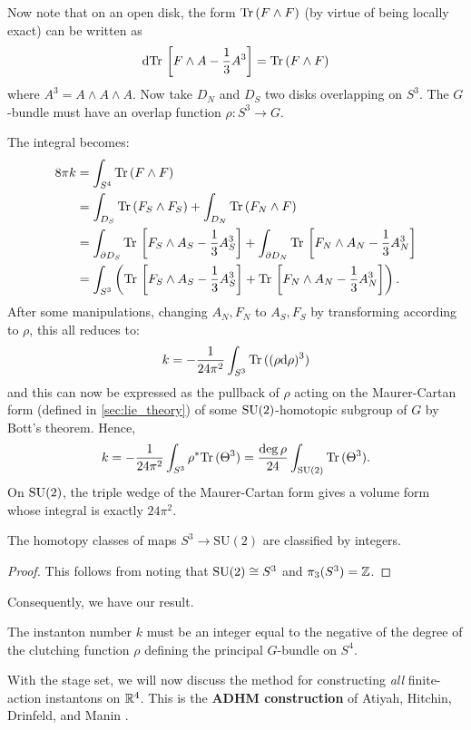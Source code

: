 		Now note that on an open disk, the form $\mathrm{Tr}\, (F \wedge F)$ (by virtue of being locally exact) can be written as 
		\[
			\mathrm{d} \mathrm{Tr}\, \left[F \wedge A - \frac13 A^3 \right] = \mathrm{Tr}\,( F \wedge F)
		\]
		where $A^3 = A \wedge A \wedge A$.
		Now take $D_N$ and $D_S$ two disks overlapping on $S^3$. The $G$-bundle must have an overlap function $\rho: S^3 \to G$.
	
		The integral becomes:
		\[
		\begin{aligned}
			8\pi k &= \int_{S^4} \mathrm{Tr}\, (F \wedge F)\\
				   &= \int_{D_S} \mathrm{Tr}\, (F_S \wedge F_S) + \int_{D_N} \mathrm{Tr}\, (F_N \wedge F)\\
				   &= \int_{\partial D_S} \mathrm{Tr}\, \left[F_S \wedge A_S - \frac13 A_S^3 \right] 
				   + \int_{\partial D_N} \mathrm{Tr}\, \left[F_N \wedge A_N - \frac13 A_N^3 \right]\\
				   &= \int_{S^3} \left( \mathrm{Tr}\, \left[F_S \wedge A_S - \frac13 A_S^3 \right] + \mathrm{Tr}\, \left[F_N \wedge A_N - \frac13 A_N^3 \right] \right).
		\end{aligned}
		\]
		After some manipulations, changing $A_N, F_N$ to $A_S, F_S$ by transforming according to $\rho$, this all reduces to:
		\[
			k = - \frac{1}{24\pi^2} \int_{S^3} \mathrm{Tr}\,((\rho \mathrm{d} \rho)^3)
		\]
		and this can now be expressed as the pullback of $\rho$ acting on the Maurer-Cartan form (defined in \ref{sec:lie_theory}) of some $\mathrm{SU}(2)$-homotopic subgroup of $G$ by Bott's theorem. Hence,
		\[
			k = - \frac{1}{24\pi^2} \int_{S^3} \rho^* \mathrm{Tr}\,(\Theta^3) = \frac{\deg \rho}{24} \int_{\mathrm{SU}(2)} \mathrm{Tr}\,(\Theta^3).
		\]
		On $\mathrm{SU}(2)$, the triple wedge of the Maurer-Cartan form gives a volume form whose integral is exactly $24\pi^2$.

		\begin{prop}
			The homotopy classes of maps $S^3 \to \mathrm{SU}(2)$ are classified by integers.
		\end{prop}
		\begin{proof}
			This follows from noting that $\mathrm{SU}(2) \cong S^3$ and $\pi_3(S^3) = \mathbb{Z}$.
		\end{proof}
		\noindent Consequently, we have our result.
		\begin{prop}
			 The instanton number $k$ must be an integer equal to the negative of the degree of the clutching function $\rho$ defining the principal $G$-bundle on $S^4$.
		\end{prop}
		
		\noindent With the stage set, we will now discuss the method for constructing \emph{all} finite-action instantons on $\mathbb{R}^4$. This is the \textbf{ADHM construction} of Atiyah, Hitchin, Drinfeld, and Manin \cite{atiyah65}.

